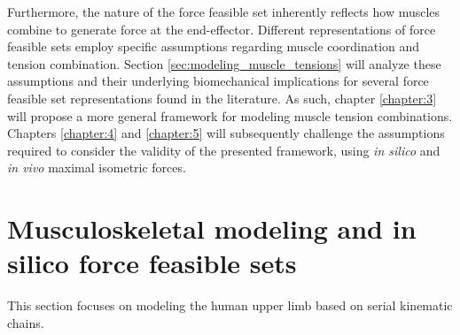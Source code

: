 Furthermore, the nature of the force feasible set inherently reflects how muscles combine to generate force at the end-effector. Different representations of force feasible sets employ specific assumptions regarding muscle coordination and tension combination. Section \ref{sec:modeling_muscle_tensions} will analyze these assumptions and their underlying biomechanical implications for several force feasible set representations found in the literature. As such, chapter \ref{chapter:3} will propose a more general framework for modeling muscle tension combinations. Chapters \ref{chapter:4} and \ref{chapter:5} will subsequently challenge the assumptions required to consider the validity of the presented framework, using \emph{in silico} and \emph{in vivo} maximal isometric forces. 


\section{Musculoskeletal modeling and in silico force feasible sets}
\label{sec:muscu_model_in_silico_ffs}
This section focuses on modeling the human upper limb based on serial kinematic chains.

